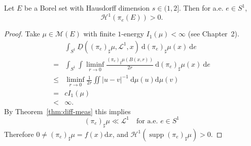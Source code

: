 \begin{theorem}\label{thm:proj-H1}
Let $E$ be a Borel set with Hausdorff dimension $s\in(1,2]$. Then for a.e. $e\in S^{1}$,
$$\mathcal{H}^{1}(\pi_{e}(E))>0.
$$
\end{theorem}

\begin{proof}
Take $\mu\in\mathcal{M}(E)$ with finite $1$-energy $I_{1}(\mu)<\infty$ (see Chapter~2). 
$$
\begin{aligned}
    & \int _{S^{1}}\underline{D}((\pi _{e})_{\sharp}\mu,\mathcal{L}^{1},x)\ \mathrm{d}(\pi _{e})_{\sharp}\mu(x)\ \mathrm{d}e \\
    = & \int _{S^{1}}\int \liminf_{ r \to 0 } \frac{(\pi _{e})_{\sharp}\mu(B(x,r))}{2r}\ \mathrm{d}(\pi _{e})_{\sharp}\mu(x)\ \mathrm{d}e \\
    \leq & \liminf_{ r \to 0 } \frac{1}{2r}\iint \lvert u-v \rvert ^{-1}\ \mathrm{d}\mu(u)\mathrm{d}\mu(v) \\
    = & c I_{1}(\mu) \\
    < & \infty.
\end{aligned}
$$
By Theorem~\ref{thm:diff-meas} this implies 
$$
(\pi_{e})_{\sharp}\mu\ll\mathcal{L}^{1}\quad \text{for a.e. }e \in S^{1}
$$
Therefore $0\neq (\pi_{e})_{\sharp}\mu=f(x)\mathrm{d}x$, and $\mathcal{H}^{1}(\operatorname{supp}(\pi_{e})_{\sharp}\mu)>0$.
\end{proof}